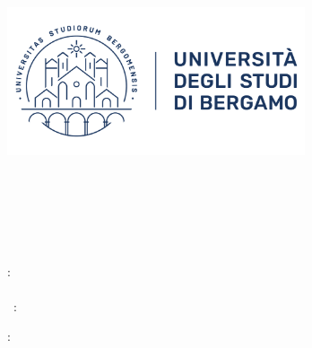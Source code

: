 \makeatletter
\includegraphics[width=8.79cm]{images/unibg-logo-wide.png}

\vspace{0.5cm}

\begin{changemargin}{4cm}{0cm}
  \@trDepartment \\
  \@department

  \vspace{0.5cm}

  \@trCourseB \\
  \@course

  \vspace{0.1cm}

  \@trClass~\@class

  \vfill

  {\Huge\textbf{\@title}}

  {\LARGE\@subtitle}

  \vfill

  \begin{multicols}{2}
  : \\
  \textit{\@authors} \\
    {\@trStudentNumber~\@studentids}{\@trStudentNumbers: \\ \@studentids}

  \columnbreak
  
  \@trAdvisor: \\ \textit{\@advisor}
  
  \vspace{0.5cm}
  
  \ifthenelse{\equal{\@coadvisor}{}}{}{\@trCoAdvisor: \\ \textit{\@coadvisor}}
  \end{multicols}

  \vfill

  \@trAnnoAccademico \\
  \@academicyear

\end{changemargin}
\makeatother
